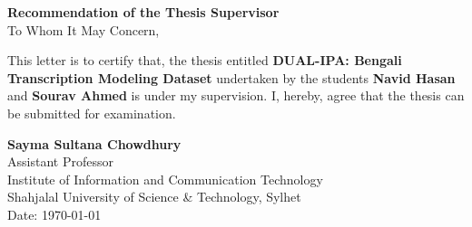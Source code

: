 \newpage
    \begin{center}
        \huge
        \textbf{Recommendation of the Thesis Supervisor}\\
        \vspace{1cm}
        \large
        To Whom It May Concern,
        \vspace{1cm}
    \end{center}
    
\begin{FlushLeft}
  \large
  This letter is to certify that, the thesis entitled \textbf{DUAL-IPA: Bengali Transcription Modeling Dataset} undertaken by the students \textbf{Navid Hasan} and \textbf{Sourav Ahmed} is under my supervision. I, hereby, agree that the thesis can be submitted for examination.\\
  \vspace{.50cm}
  \vspace{1cm}
  
  
  \vspace{0.6cm}
  
   \textbf{Sayma Sultana Chowdhury}\\
    {\large{Assistant Professor}}\\
    {\large{Institute of Information and Communication Technology}}\\
    {\large{Shahjalal University of Science \& Technology, Sylhet}}\\
    {\large{Date: \today}}
    

\end{FlushLeft}